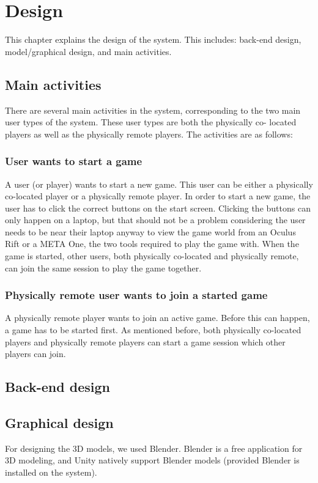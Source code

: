 \chapter{Design} \label{cha:design}
	This chapter explains the design of the system. This includes: back-end
	design, model/graphical design, and main activities.

	\section{Main activities} \label{sec:mainactivities}
		There are several main activities in the system, corresponding to the two
		main user types of the system. These user types are both the physically co-
		located	players as well as the physically remote players. The activities
		are as follows:

		\subsection{User wants to start a game} \label{ssec:userstartgame}
			A user (or player) wants to start a new game. This user can be either
			a physically co-located player or a physically remote player. In
			order to start a new game, the user has to click the correct buttons
			on the start screen. Clicking the buttons can only happen on a laptop,
			but that should not be a problem considering the user needs to be near
			their laptop anyway to view the game world from an Oculus Rift or a
			META One, the two tools required to play the game with. When the game
			is started, other users, both physically co-located and physically
			remote, can join the same session to play the game together.

		\subsection{Physically remote user wants to join a started game}
				\label{ssec:remotejoingame}
			A physically remote player wants to join an active game. Before
			this can happen, a game has to be started first. As mentioned
			before, both physically co-located players and physically remote
			players can start a game session which other players can join.

	\section{Back-end design} \label{sec:backenddesign}


	\section{Graphical design} \label{sec:graphicaldesign}
		For designing the 3D models, we used Blender. Blender is a free application
		for 3D modeling, and Unity natively support Blender models (provided Blender
		is installed on the system).

